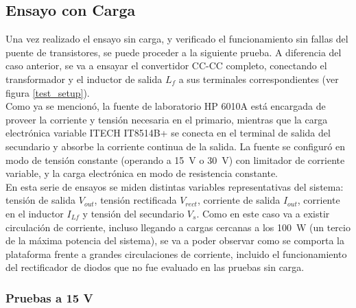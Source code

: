 \subsection{Ensayo con Carga}

Una vez realizado el ensayo sin carga, y verificado el funcionamiento sin fallas del puente de transistores, se puede proceder a la siguiente prueba. A diferencia del caso anterior, se va a ensayar el convertidor CC-CC completo, conectando el transformador y el inductor de salida $L_f$ a sus terminales correspondientes (ver figura \ref{test_setup}).\\

Como ya se mencionó, la fuente de laboratorio HP 6010A está encargada de proveer la corriente y tensión necesaria en el primario, mientras que la carga electrónica variable ITECH IT8514B+ se conecta en el terminal de salida del secundario y absorbe la corriente continua de la salida. La fuente se configuró en modo de tensión constante (operando a \SI[]{15}{\volt} o \SI[]{30}{\volt}) con limitador de corriente variable, y la carga electrónica en modo de resistencia constante.\\

En esta serie de ensayos se miden distintas variables representativas del sistema: tensión de salida $V_{out}$, tensión rectificada $V_{rect}$, corriente de salida $I_{out}$, corriente en el inductor $I_{Lf}$ y tensión del secundario $V_s$. Como en este caso va a existir circulación de corriente, incluso llegando a cargas cercanas a los \SI[]{100}{\watt} (un tercio de la máxima potencia del sistema), se va a poder observar como se comporta la plataforma frente a grandes circulaciones de corriente, incluido el funcionamiento del rectificador de diodos que no fue evaluado en las pruebas sin carga.\\

\subsubsection{Pruebas a 15 V}


